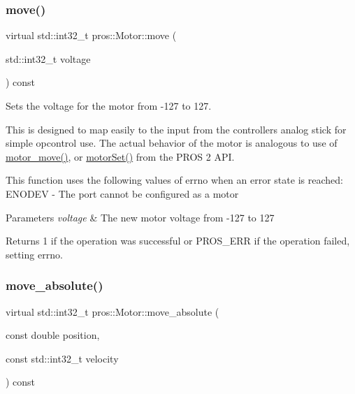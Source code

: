 \subsubsection{\texorpdfstring{move()}{move()}}
{\footnotesize\ttfamily virtual std\+::int32\+\_\+t pros\+::\+Motor\+::move (\begin{DoxyParamCaption}\item[{std\+::int32\+\_\+t}]{voltage }\end{DoxyParamCaption}) const\hspace{0.3cm}{\ttfamily [virtual]}}

Sets the voltage for the motor from -\/127 to 127.

This is designed to map easily to the input from the controller\textquotesingle{}s analog stick for simple opcontrol use. The actual behavior of the motor is analogous to use of \hyperlink{motors_8h_a7da9bf1e229e50bfeeaecf026a6d0d08}{motor\+\_\+move()}, or \hyperlink{api__legacy_8h_a59a0d6bd050cd259ad488e68f856ae81}{motor\+Set()} from the P\+R\+OS 2 A\+PI.

This function uses the following values of errno when an error state is reached\+: E\+N\+O\+D\+EV -\/ The port cannot be configured as a motor


\begin{DoxyParams}{Parameters}
{\em voltage} & The new motor voltage from -\/127 to 127\\
\hline
\end{DoxyParams}
\begin{DoxyReturn}{Returns}
1 if the operation was successful or P\+R\+O\+S\+\_\+\+E\+RR if the operation failed, setting errno. 
\end{DoxyReturn}
\mbox{\label{classpros_1_1Motor_a7851ffa40c9803d75398a5be355de395}} 
\subsubsection{\texorpdfstring{move\+\_\+absolute()}{move\_absolute()}}
{\footnotesize\ttfamily virtual std\+::int32\+\_\+t pros\+::\+Motor\+::move\+\_\+absolute (\begin{DoxyParamCaption}\item[{const double}]{position,  }\item[{const std\+::int32\+\_\+t}]{velocity }\end{DoxyParamCaption}) const\hspace{0.3cm}{\ttfamily [virtual]}}

